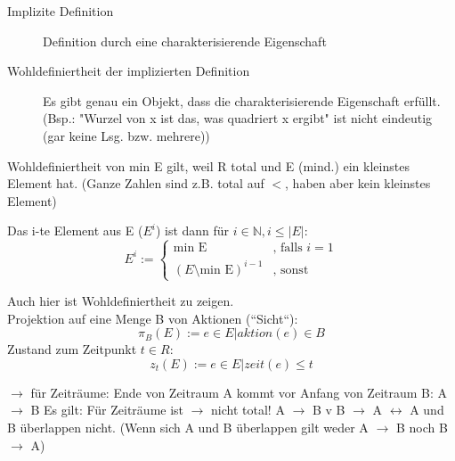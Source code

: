 \begin{description}
	\item[Implizite Definition] Definition durch eine charakterisierende Eigenschaft
	\item[Wohldefiniertheit der implizierten Definition] Es gibt genau ein Objekt, dass die charakterisierende Eigenschaft erfüllt.
	(Bsp.: "Wurzel von x ist das, was quadriert x ergibt" ist nicht eindeutig (gar keine Lsg. bzw. mehrere))
\end{description}

Wohldefiniertheit von min E gilt, weil R total und E (mind.) ein kleinstes Element hat. (Ganze Zahlen sind z.B. total auf $<$, haben aber kein kleinstes Element)

Das i-te Element aus E ($E^i$) ist dann für $i \in \mathbb{N}, i \leq |E|$:
\begin{equation*}
	E^i := \begin{cases}
		\text{min E}&\text{, falls }i = 1\\
		(E \setminus{\text{min E}})^{i-1}& \text{, sonst}
	\end{cases}
\end{equation*}

Auch hier ist Wohldefiniertheit zu zeigen.\\
Projektion auf eine Menge B von Aktionen (“Sicht“):
\begin{equation*}
	\pi_B(E) := e \in E | aktion(e) \in B
\end{equation*}
Zustand zum Zeitpunkt $t \in R$:
\begin{equation*}
	z_t(E) := e \in E | zeit(e) \leq t
\end{equation*}


$\rightarrow$ für Zeiträume: Ende von Zeitraum A kommt vor Anfang von Zeitraum B: A $\rightarrow$ B Es gilt: Für Zeiträume ist $\rightarrow$ nicht total!
A $\rightarrow$ B v B $\rightarrow$ A $\leftrightarrow$ A und B überlappen nicht. (Wenn sich A und B überlappen gilt weder A  $\rightarrow$ B noch B  $\rightarrow$ A)

